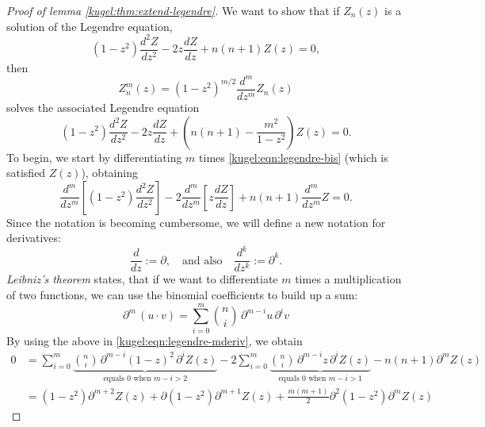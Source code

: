 \begin{proof}[Proof of lemma \ref{kugel:thm:extend-legendre}]
  We want to show that if $Z_n(z)$ is a solution of the Legendre equation,
  \begin{equation} \label{kugel:eqn:legendre-bis}
    (1 - z^2)\frac{d^2 Z}{dz^2}
    - 2z\frac{d Z}{dz}
    + n(n + 1) Z(z) = 0,
  \end{equation}
  then
  \begin{equation*}
    Z^m_n(z) = (1 - z^2)^{m/2} \frac{d^m}{dz^m}Z_n(z)
  \end{equation*}
  solves the associated Legendre equation 
  \begin{equation*}
    (1 - z^2)\frac{d^2 Z}{dz^2}
    - 2z\frac{d Z}{dz}
    + \left( n(n + 1) - \frac{m^2}{1 - z^2} \right) Z(z) = 0.
  \end{equation*}
  To begin, we start by differentiating $m$ times \eqref{kugel:eqn:legendre-bis}
  (which is satisfied $Z(z)$), obtaining
  \begin{equation} \label{kugel:eqn:legendre-mderiv}
    \frac{d^m}{dz^m}\left[
      (1-z^2)\frac{d^2Z}{dz^2}
    \right]
    -2 \frac{d^m}{dz^m}\left[ z\frac{dZ}{dz} \right]
    + n(n+1)\frac{d^m}{dz^m}Z = 0.
  \end{equation}
  Since the notation is becoming cumbersome, we will define a new notation for
  derivatives:
  \begin{equation*}
    \frac{d}{dz} := \partial, \quad \text{and also} \quad
    \frac{d^k}{dz^k} := \partial^k.
  \end{equation*}
  \emph{Leibniz's theorem} states, that if we want to differentiate $m$ times a
  multiplication of two functions, we can use the binomial coefficients to build
  up a sum:
  \begin{equation*} %
    \partial^m \, (u \cdot v)
      = \sum_{i=0}^m \binom{n}{i} \, \partial^{m-i} u \, \partial^i v
  \end{equation*}
  By using the above in \eqref{kugel:eqn:legendre-mderiv}, we obtain
  \begin{align}
    0 &= \sum_{i=0}^m \underbrace{
      \binom{n}{i} \, \partial^{m-i} (1-z)^2 \, \partial^i Z(z)
    }_{\text{equals 0 when } m-i > 2}
    - 2 \sum_{i=0}^m \underbrace{
      \binom{n}{i} \, \partial^{m-i} z \, \partial^i Z(z)
    }_{\text{equals 0 when } m-i > 1}
    - n(n+1) \partial^m Z(z)
    \nonumber \\
    &= (1-z^2) \partial^{m+2} Z(z)
    + \partial (1-z^2) \partial^{m+1} Z(z)
    + \frac{m(m+1)}{2} \partial^2 (1-z^2) \partial^m Z(z)

\end{align}
\end{proof}
